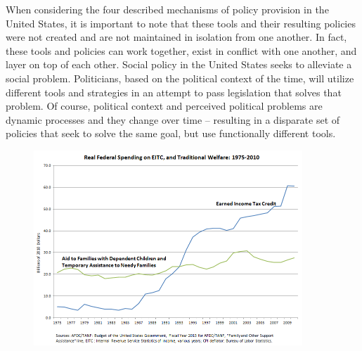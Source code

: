 \documentclass[12pt]{article}
\begin{document}
When considering the four described mechanisms of policy provision in the United States, it is important to note that these tools and their resulting policies were not created and are not maintained in isolation from one another. In fact, these tools and policies can work together, exist in conflict with one another, and layer on top of each other. Social policy in the United States seeks to alleviate a social problem. Politicians, based on the political context of the time, will utilize different tools and strategies in an attempt to pass legislation that solves that problem. Of course, political context and perceived political problems are dynamic processes and they change over time -- resulting in a disparate set of policies that seek to solve the same goal, but use functionally different tools.
\begin{figure}[h!]
  \centering
\includegraphics[width=0.9\textwidth]{graph.png}
\end{figure}
\end{document}
